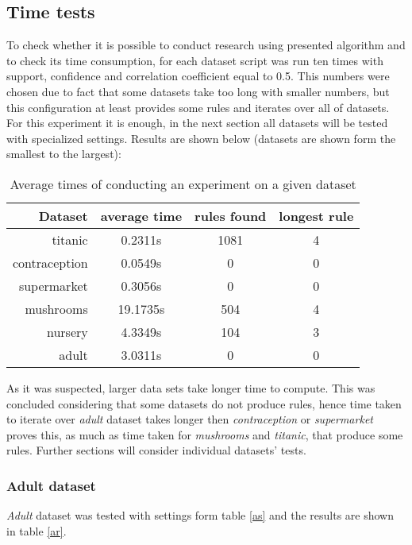\documentclass{article}
\begin{document}
	\subsection{Time tests}
	To check whether it is possible to conduct research using presented algorithm and to check its time consumption, for each dataset script was run ten times with support, confidence and correlation coefficient equal to 0.5. This numbers were chosen due to fact that some datasets take too long with smaller numbers, but this configuration at least provides some rules and iterates over all of datasets. For this experiment it is enough, in the next section all datasets will be tested with specialized settings. Results are shown below (datasets are shown form the smallest to the largest):
	\begin{table}[H]
		\centering
		\begin{tabular}{r||c |c |c }
			Dataset&average time&rules found&longest rule\\
			\hline
			\hline
			titanic&0.2311s&1081&4\\
			\hline
			contraception&0.0549s&0&0\\
			\hline
			supermarket&0.3056s&0&0\\
			\hline
			mushrooms&19.1735s&504&4\\
			\hline
			nursery&4.3349s&104&3\\
			\hline
			adult&3.0311s&0&0\\
		\end{tabular}
		\caption{Average times of conducting an experiment on a given dataset}
	\end{table}
	As it was suspected, larger data sets take longer time to compute. This was concluded considering that some datasets do not produce rules, hence time taken to iterate over \textit{adult} dataset takes longer then \textit{contraception} or \textit{supermarket} proves this, as much as time taken for \textit{mushrooms} and \textit{titanic}, that produce some rules. Further sections will consider individual datasets' tests.
	
	
	\subsubsection{Adult dataset}
	\textit{Adult} dataset was tested with settings form table \ref{as} and the results are shown in table \ref{ar}.
	
\end{document}
